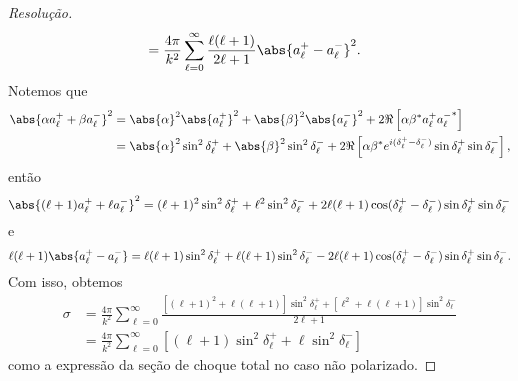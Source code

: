 \begin{proof}[Resolução]
\begin{align*}
                                  &= \frac{4\pi}{k^2} \sum_{\ell = 0}^\infty \frac{\ell (\ell + 1)}{2\ell + 1} \abs{a_\ell^+ - a_\ell^-}^2.
   \end{align*}
   Notemos que
   \begin{align*}
      \abs{\alpha a_{\ell}^+ + \beta a_{\ell}^-}^2
      &= \abs{\alpha}^2 \abs{a_{\ell}^+}^2 + \abs{\beta}^2 \abs{a_{\ell}^-}^2 + 2\Re\left[\alpha \beta^* a_{\ell}^+ {a_{\ell}^-}^*\right]\\
      &= \abs{\alpha}^2 \sin^2\delta_{\ell}^+ + \abs{\beta}^2 \sin^2\delta_{\ell}^- + 2\Re\left[\alpha \beta^* e^{i(\delta_{\ell}^+ - \delta_{\ell}^-)} \sin\delta_{\ell}^+\sin\delta_{\ell}^-\right],
   \end{align*}
   então
   \begin{equation*}
       \abs{(\ell + 1)a_{\ell}^+ + \ell a_{\ell}^-}^2 = (\ell + 1)^2 \sin^2\delta_{\ell}^+ + \ell^2 \sin^2\delta_{\ell}^- + 2 \ell (\ell + 1) \cos(\delta_{\ell}^+ - \delta_{\ell}^-) \sin\delta_{\ell}^+ \sin \delta_{\ell}^-
   \end{equation*}
   e
   \begin{equation*}
      \ell(\ell + 1)\abs{a_{\ell}^+ - a_{\ell}^-} = \ell(\ell + 1) \sin^2\delta_{\ell}^+ + \ell(\ell + 1) \sin^2 \delta_{\ell}^- - 2\ell (\ell + 1) \cos(\delta_{\ell}^+ - \delta_{\ell}^-) \sin\delta_{\ell}^+ \sin \delta_{\ell}^-.
   \end{equation*}
   Com isso, obtemos
   \begin{align*}
      \sigma &= \frac{4\pi}{k^2} \sum_{\ell = 0}^\infty \frac{\left[(\ell + 1)^2 + \ell(\ell + 1)\right]\sin^2\delta_{\ell}^+ + \left[\ell^2 + \ell(\ell + 1)\right]\sin^2\delta_{\ell}^-}{2\ell + 1}\\
             &= \frac{4\pi}{k^2} \sum_{\ell = 0}^\infty \left[(\ell + 1) \sin^2\delta_{\ell}^+ + \ell \sin^2\delta_{\ell}^-\right]
   \end{align*}
   como a expressão da seção de choque total no caso não polarizado.
\end{proof}
